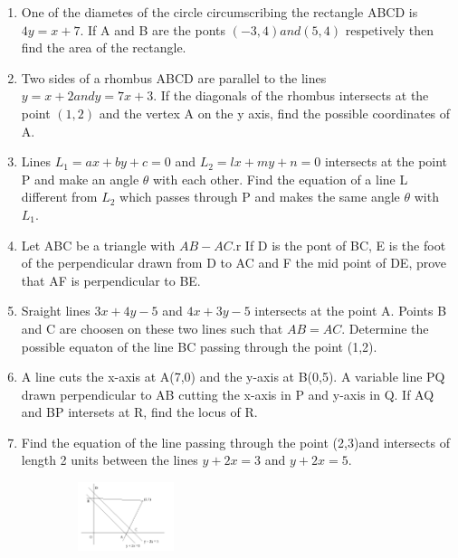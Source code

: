 \documentclass[12pt]{article}
\begin{document}
\begin{enumerate}
\item One of the diametes of the circle circumscribing the rectangle ABCD is $4y=x+7$. If A and B are the ponts $(-3,4) and (5,4)$ respetively then find the area of the rectangle.\\
\item Two sides of a rhombus ABCD are parallel to the lines $y=x+2 and y=7x+3$. If the diagonals of the rhombus intersects at the point $(1,2)$ and the vertex A on the y axis, find the possible coordinates of A.\\
\item Lines $L_1=ax+by+c=0$ and $L_2=lx+my+n=0$ intersects at the point P and make an angle $\theta$ with each other. Find the equation of a line L different from $L_2$ which passes through P and makes the same angle $\theta$ with $L_1$.\\
\item Let ABC be a triangle with $AB-AC$.r If D is the pont of BC, E is the foot of the perpendicular drawn from D to AC and F the mid point of DE, prove that AF is perpendicular to BE.\\
\item Sraight lines $3x+4y-5$ and $4x+3y-5$ intersects at the point A. Points B and C 
are choosen on these two lines such that $AB=AC$. Determine the possible equaton of the line BC passing through the point (1,2).\\
\item A line cuts the x-axis at A(7,0) and the y-axis at B(0,5). A variable line PQ drawn perpendicular to AB cutting the x-axis  in P and y-axis in Q. If AQ and BP intersets at R, find the locus of R.\\
\item Find the equation of the line passing through the point (2,3)and intersects of length 2 units between the lines $y+2x=3$ and $y+2x=5$.\\
 
 \begin{figure}[h]
\centering
    \includegraphics[width=4cm, height=2cm]{fig.png}
     \end{figure}
     

\end{enumerate}
\end{document}
